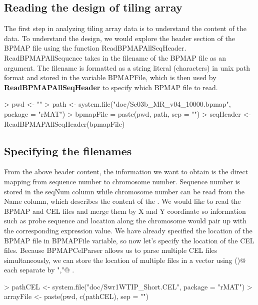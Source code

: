 \documentclass[11pt]{article}
\begin{document}
\subsection*{Reading the design of tiling array}

	The first step in analyzing tiling array data is to understand the content of the data. To understand the design, we would explore the header section of the BPMAP file using the function ReadBPMAPAllSeqHeader. ReadBPMAPAllSequence takes in the filename of the BPMAP file as an argument. The filename is formatted as a string literal (characters) in unix path format and stored in the variable BPMAPFile, which is then used by \textbf{ReadBPMAPAllSeqHeader} to specify which BPMAP file to read. 

\begin{Schunk}
\begin{Sinput}
> pwd <- ""
> path <- system.file("doc/Sc03b_MR_v04_10000.bpmap", package = "rMAT")
> bpmapFile = paste(pwd, path, sep = "")
> seqHeader <- ReadBPMAPAllSeqHeader(bpmapFile)
\end{Sinput}
\end{Schunk}

\subsection*{Specifying the filenames}
From the above header content, the information we want to obtain is the direct mapping from sequence number to chromosome number.
Sequence number is stored in the seqNum column while chromosome number can be read from the Name column, which describes the content of the \verb@sequence@.
\newline
	We would like to read the BPMAP and CEL files and merge them by X and Y coordinate so information such as probe sequence and location along the chromosome would pair up with the corresponding expression value. 
\newline
	We have already specified the location of the BPMAP file in BPMAPFile variable, so now let's specify the location of the CEL files. Because BPMAPCelParser allows us to parse multiple CEL files simultaneously, we can store the location of multiple files in a vector using \verb@c()@
 each separate by \verb@","@
. 
\begin{Schunk}
\begin{Sinput}
> pathCEL <- system.file("doc/Swr1WTIP_Short.CEL", package = "rMAT")
> arrayFile <- paste(pwd, c(pathCEL), sep = "")
\end{Sinput}
\end{Schunk}
\end{document}
